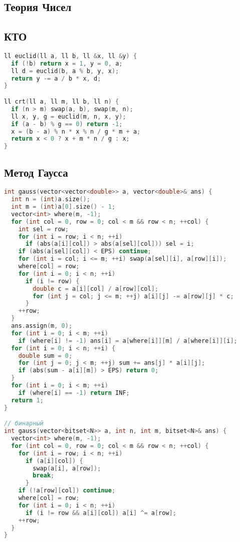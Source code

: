 \documentclass[10pt,a4paper,landscape,twosided]{extarticle}
\begin{document}
\begin{multicols}{3}
\section{Теория Чисел}

\subsection{КТО}
\begin{lstlisting}[language=C++]
ll euclid(ll a, ll b, ll &x, ll &y) {
  if (!b) return x = 1, y = 0, a;
  ll d = euclid(b, a % b, y, x);
  return y -= a / b * x, d;
}

ll crt(ll a, ll m, ll b, ll n) {
  if (n > m) swap(a, b), swap(m, n);
  ll x, y, g = euclid(m, n, x, y);
  if (a - b) % g == 0) return -1;
  x = (b - a) % n * x % n / g * m + a;
  return x < 0 ? x + m * n / g : x;
}\end{lstlisting}

\subsection{Метод Гаусса}
\begin{lstlisting}[language=C++]
int gauss(vector<vector<double>> a, vector<double>& ans) {
  int n = (int)a.size();
  int m = (int)a[0].size() - 1;
  vector<int> where(m, -1);
  for (int col = 0, row = 0; col < m && row < n; ++col) {
    int sel = row;
    for (int i = row; i < n; ++i)
      if (abs(a[i][col]) > abs(a[sel][col])) sel = i;
    if (abs(a[sel][col]) < EPS) continue;
    for (int i = col; i <= m; ++i) swap(a[sel][i], a[row][i]);
    where[col] = row;
    for (int i = 0; i < n; ++i)
      if (i != row) {
        double c = a[i][col] / a[row][col];
        for (int j = col; j <= m; ++j) a[i][j] -= a[row][j] * c;
      }
    ++row;
  }
  ans.assign(m, 0);
  for (int i = 0; i < m; ++i)
    if (where[i] != -1) ans[i] = a[where[i]][m] / a[where[i]][i];
  for (int i = 0; i < n; ++i) {
    double sum = 0;
    for (int j = 0; j < m; ++j) sum += ans[j] * a[i][j];
    if (abs(sum - a[i][m]) > EPS) return 0;
  }
  for (int i = 0; i < m; ++i)
    if (where[i] == -1) return INF;
  return 1;
}

// бинарный
int gauss(vector<bitset<N>> a, int n, int m, bitset<N>& ans) {
  vector<int> where(m, -1);
  for (int col = 0, row = 0; col < m && row < n; ++col) {
    for (int i = row; i < n; ++i)
      if (a[i][col]) {
        swap(a[i], a[row]);
        break;
      }
    if (!a[row][col]) continue;
    where[col] = row;
    for (int i = 0; i < n; ++i)
      if (i != row && a[i][col]) a[i] ^= a[row];
    ++row;
  }
}\end{lstlisting}


\end{multicols}
\end{document}
